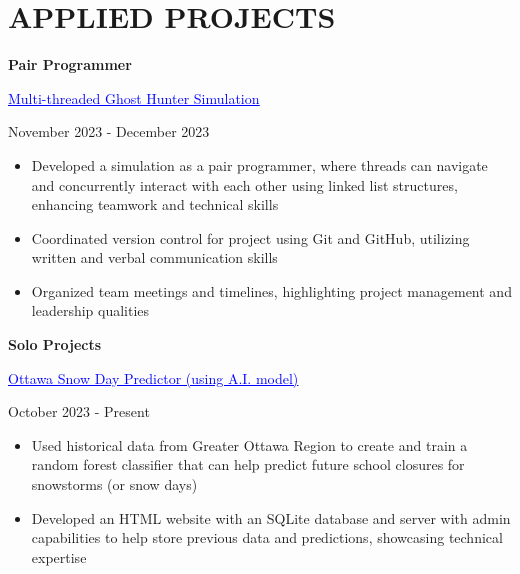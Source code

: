 \documentclass[a4paper,11pt]{article}
\begin{document}
\vspace{2pt}
\section{APPLIED PROJECTS}
\begin{minipage}{.65\linewidth}
    \textbf{Pair Programmer} 
\end{minipage}

\begin{minipage}{.65\linewidth}
    \href{https://github.com/JeremyFriesenGitHub/Multi-threaded-Ghost-Hunter-Simulation}{\textcolor{blue}{\uline{Multi-threaded Ghost Hunter Simulation}}}
\end{minipage}
\hfill %
\begin{minipage}{.34\linewidth}
    \flushright
    November 2023 - December 2023
\end{minipage}
\begin{minipage}{\linewidth}
\vspace{10pt}
\begin{itemize}
    \item Developed a simulation as a pair programmer, where threads can navigate and concurrently interact with each other using linked list structures, enhancing teamwork and technical skills
    \item Coordinated version control for project using Git and GitHub, utilizing written and verbal communication skills 
    \item Organized team meetings and timelines, highlighting project management and leadership qualities
     \end{itemize}
\end{minipage}
\newpage
\begin{minipage}{.65\linewidth}
    \textbf{Solo Projects} 
\end{minipage}
\begin{minipage}{.65\linewidth}
    \href{https://github.com/JeremyFriesenGitHub/A.I.-Snow-Day-Predictor}{\textcolor{blue}{\uline{Ottawa Snow Day Predictor (using A.I. model)}}} 
\end{minipage}
\hfill
\begin{minipage}{.34\linewidth}
    \flushright
    October 2023 - Present
\end{minipage}
\begin{minipage}{\linewidth}
\vspace{10pt}
\begin{itemize}
    \item Used historical data from Greater Ottawa Region to create and train a random forest classifier that can help predict future school closures for snowstorms (or snow days)
    \item Developed an HTML website with an SQLite database and server with admin capabilities to help store previous data and predictions, showcasing technical expertise
  \end{itemize}
  \vspace{1pt}
\end{minipage}
\end{document}
